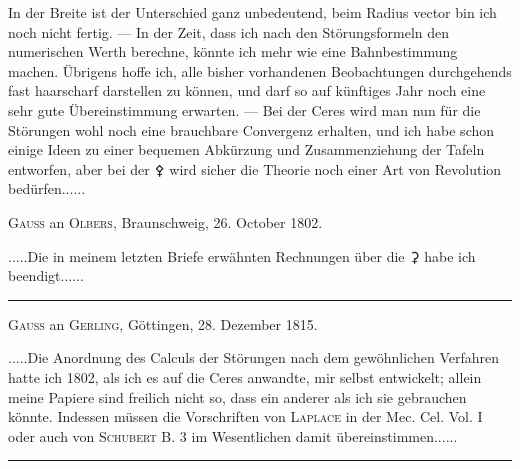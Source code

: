 \par
\noindent\hspace*{\parindent}In der Breite ist der Unterschied ganz unbedeutend, beim Radius vector bin ich noch nicht fertig. — In der Zeit, dass ich nach den Störungsformeln den numerischen Werth berechne, könnte ich mehr wie eine Bahnbestimmung machen. Übrigens hoffe ich, alle bisher vorhandenen Beobachtungen durchgehends fast haarscharf darstellen zu können, und darf so auf künftiges Jahr noch eine sehr gute Übereinstimmung erwarten. — Bei der Ceres wird man nun für die Störungen wohl noch eine brauchbare Convergenz erhalten, und ich habe schon einige Ideen zu einer bequemen Abkürzung und Zusammenziehung der Tafeln entworfen, aber bei der {\AstroSymbols ⚴} wird sicher die Theorie noch einer Art von Revolution bedürfen.\quad.\quad.\quad.\quad.\quad.
\par\bigskip
\begin{center}\textsc{Gauss} an \textsc{Olbers}, Braunschweig, 26. October 1802.\end{center}
\noindent\hspace*{\parindent}.\quad.\quad.\quad.\quad.\quad Die in meinem letzten Briefe erwähnten Rechnungen über die {\AstroSymbols ⚳} habe ich beendigt.\quad.\quad.\quad.\quad.\quad.
\par\medskip
\begin{center}\rule{.27\linewidth}{.4pt}\end{center}
\par\bigskip
\begin{center}\textsc{Gauss} an \textsc{Gerling}, Göttingen, 28. Dezember 1815.\end{center}
\noindent\hspace*{\parindent}.\quad.\quad.\quad.\quad.\quad Die Anordnung des Calculs der Störungen nach dem gewöhnlichen Verfahren hatte ich 1802, als ich es auf die Ceres anwandte, mir selbst entwickelt; allein meine Papiere sind freilich nicht so, dass ein anderer als ich sie gebrauchen könnte. Indessen müssen die Vorschriften von \textsc{Laplace} in der Mec. Cel. Vol. I oder auch von \textsc{Schubert} B. 3 im Wesentlichen damit übereinstimmen.\quad.\quad.\quad.\quad.\quad.
\par\medskip
\begin{center}\rule{.27\linewidth}{.4pt}\end{center}
